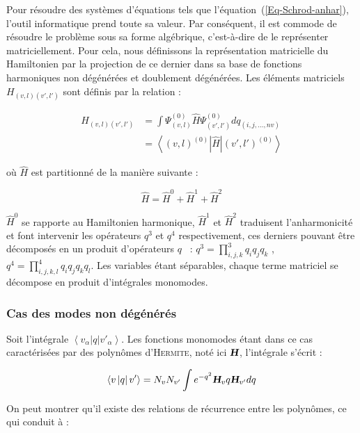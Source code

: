 Pour résoudre des systèmes d'équations tels que l'équation~(\ref{Eq-Schrod-anhar}), l'outil informatique prend toute sa valeur. Par conséquent, il est commode de résoudre le problème sous sa forme algébrique, c'est-à-dire de le représenter matriciellement. Pour cela, nous définissons la représentation matricielle du Hamiltonien par la projection de ce dernier dans sa base de fonctions harmoniques non dégénérées et doublement dégénérées. Les éléments matriciels $H_{(v,l)(v',l')}$ sont définis par la relation :

\begin{align}
	H_{(v,l)(v',l')} &= \int \Psi^{(0)}_{(v,l)} \hat{H} \Psi^{(0)}_{(v',l')}dq_{(i,j,\ldots ,nv)} \\
	        &= \left\langle (v,l)^{(0)}\right| \hat{H} \left| (v',l')^{(0)} \right\rangle 
\end{align}
 
\noindent où $\hat{H}$ est partitionné de la manière suivante : 

\begin{equation}
	\hat{H} = \hat{H}^0 + \hat{H}^1 + \hat{H}^2 
\end{equation}

$\hat{H}^0$ se rapporte au Hamiltonien harmonique, $\hat{H}^1$ et $\hat{H}^2$ traduisent l'anharmonicité et font intervenir les opérateurs $q^3$ et $q^4$ respectivement, ces derniers pouvant être décomposés en un produit d'opérateurs $q$~\cite{barchewitz1961spectroscopie} : $q^3 = \displaystyle{\prod^3_{i,j,k}q_iq_jq_k}$ , $q^4 = \displaystyle{\prod^4_{i,j,k,l}q_iq_jq_kq_l}$.
Les variables étant séparables, chaque terme matriciel se décompose en produit d'intégrales monomodes.

\subsubsection*{Cas des modes non dégénérés}

Soit l'intégrale $\left\langle v_{\alpha}\left|q \right|v'_{\alpha} \right\rangle$. Les fonctions monomodes étant dans ce cas caractérisées par des polynômes d'\textsc{Hermite}, noté ici $\textsl{\textbf{H}}$, l'intégrale s'écrit :

\begin{equation}
	\left\langle v \left|q \right|v' \right\rangle = N_v N_{v'} \int e^{-q^2} \textsl{\textbf{H}}_v q \textsl{\textbf{H}}_{v'} dq
\end{equation}

On peut montrer qu'il existe des relations de récurrence entre les polynômes, ce qui conduit à \cite{wilson1955molecular} :

